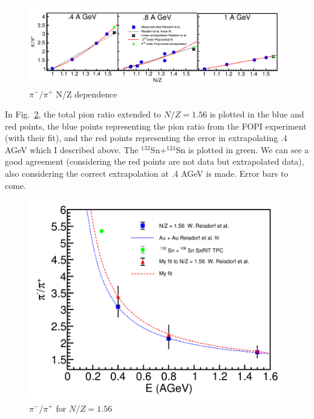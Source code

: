 \documentclass[12pt, letterpaper, twoside]{article}
\begin{document}
\begin{figure}[!hbt]
\centering
\includegraphics[width=\textwidth]{NZDependence.png}
\caption{$\pi^-/\pi^+$ N/Z dependence }
\label{fig:nzdepend}
\end{figure}
 
 In Fig.~\ref{fig:pionratio}, the total pion ratio extended to $N/Z=1.56$ is plotted in the blue and red points, the blue points representing the pion ratio from the FOPI experiment (with their fit), and the red points representing the error in extrapolating .4 AGeV which I described above. The ${}^{132}$Sn+${}^{124}$Sn is plotted in green. We can see a good agreement (considering the red points are not data but extrapolated data), also considering the correct extrapolation at .4 AGeV is made. Error bars to come. 
 
\begin{figure}[!hbt]
\centering
\includegraphics[width=\textwidth]{pionratio.png}
\caption{$\pi^-/\pi^+$ for $N/Z=1.56$}
\label{fig:pionratio}
\end{figure}
 
 
 
 
 
 
\newpage


 
 
\end{document}
